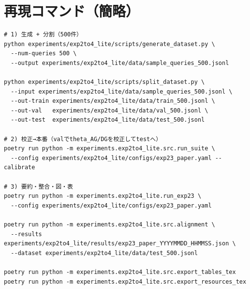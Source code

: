 \documentclass[ja=standard,xelatex]{bxjsarticle}
\begin{document}
\section*{再現コマンド（簡略）}\label{sec:repro_lite_ja}
\begin{verbatim}
# 1) 生成 + 分割（500件）
python experiments/exp2to4_lite/scripts/generate_dataset.py \
  --num-queries 500 \
  --output experiments/exp2to4_lite/data/sample_queries_500.jsonl

python experiments/exp2to4_lite/scripts/split_dataset.py \
  --input experiments/exp2to4_lite/data/sample_queries_500.jsonl \
  --out-train experiments/exp2to4_lite/data/train_500.jsonl \
  --out-val   experiments/exp2to4_lite/data/val_500.jsonl \
  --out-test  experiments/exp2to4_lite/data/test_500.jsonl

# 2) 校正→本番（valでtheta_AG/DGを校正してtestへ）
poetry run python -m experiments.exp2to4_lite.src.run_suite \
  --config experiments/exp2to4_lite/configs/exp23_paper.yaml --calibrate

# 3) 要約・整合・図・表
poetry run python -m experiments.exp2to4_lite.run_exp23 \
  --config experiments/exp2to4_lite/configs/exp23_paper.yaml

poetry run python -m experiments.exp2to4_lite.src.alignment \
  --results experiments/exp2to4_lite/results/exp23_paper_YYYYMMDD_HHMMSS.json \
  --dataset experiments/exp2to4_lite/data/test_500.jsonl

poetry run python -m experiments.exp2to4_lite.src.export_tables_tex
poetry run python -m experiments.exp2to4_lite.src.export_resources_tex
\end{verbatim}

\end{document}
